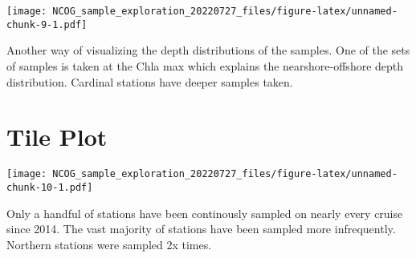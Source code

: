 \documentclass[
]{article}
\begin{document}
\texttt{[image: NCOG\_sample\_exploration\_20220727\_files/figure-latex/unnamed-chunk-9-1.pdf]}

Another way of visualizing the depth distributions of the samples. One
of the sets of samples is taken at the Chla max which explains the
nearshore-offshore depth distribution. Cardinal stations have deeper
samples taken.

\hypertarget{tile-plot}{%
\section{Tile Plot}\label{tile-plot}}

\texttt{[image: NCOG\_sample\_exploration\_20220727\_files/figure-latex/unnamed-chunk-10-1.pdf]}

Only a handful of stations have been continously sampled on nearly every
cruise since 2014. The vast majority of stations have been sampled more
infrequently. Northern stations were sampled 2x times.
\end{document}

